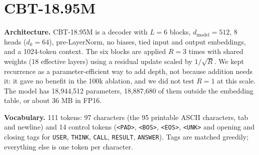 \documentclass[10pt,twocolumn]{article}
\begin{document}
\section{CBT-18.95M}\label{sec:cbt}

\textbf{Architecture.} CBT-18.95M is a decoder with $L=6$ blocks, $d_{\text{model}}=512$, 8 heads ($d_k=64$), pre-LayerNorm, no biases, tied input and output embeddings, and a 1024-token context. The six blocks are applied $R=3$ times with shared weights (18 effective layers) using a residual update scaled by $1/\sqrt{R}$. We kept recurrence as a parameter-efficient way to add depth, not because addition needs it: it gave no benefit in the 100k ablation, and we did not test $R=1$ at this scale. The model has 18,944,512 parameters, 18,887,680 of them outside the embedding table, or about 36 MB in FP16.

\textbf{Vocabulary.} 111 tokens: 97 characters (the 95 printable ASCII characters, tab and newline) and 14 control tokens (\texttt{<PAD>}, \texttt{<BOS>}, \texttt{<EOS>}, \texttt{<UNK>} and opening and closing tags for \texttt{USER}, \texttt{THINK}, \texttt{CALL}, \texttt{RESULT}, \texttt{ANSWER}). Tags are matched greedily; everything else is one token per character.
\end{document}
